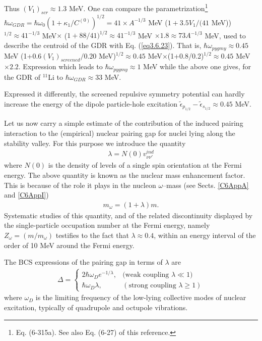 Thus $(V_1)_{scr}\approx1.3$ MeV. One can compare the parametrization\footnote{\cite{Bohr:75} Eq. (6-315a). See also Eq. (6-27) of this reference.} $\hbar\omega_{GDR}=\hbar\omega_0\left(1+\kappa_1/C^{(0)}\right)^{1/2}=41\times A^{-1/3}$ MeV ($1+3.5V_1/(41$ MeV))$^{1/2}\approx41^{-1/3}$ MeV$\times$ ($1+88/41 )^{1/2}\approx41^{-1/3}$ MeV $\times 1.8\approx 73 A^{-1/3}$ MeV, used to describe the centroid of the GDR with Eq. (\ref{eq3.6.23}). That is, $\hbar\omega_{pygmy}\approx0.45$ MeV (1+0.6$(V_1)_{screened}/0.20$ MeV)$^{1/2}\approx0.45$ MeV$\times$(1+0.8/0.2)$^{1/2}\approx0.45$ MeV$\times2.2$. Expression which leads to $\hbar\omega_{pygmy}\approx 1$ MeV while the above one gives, for the GDR of $^{11}$Li to $\hbar\omega_{GDR}\approx 33$ MeV.


Expressed it differently, the screened repulsive symmetry potential can hardly increase the energy of the dipole particle-hole excitation $\tilde\epsilon_{p_{1/2}}-\tilde\epsilon_{s_{1/2}}\approx0.45$ MeV.

Let us now carry a simple estimate of the contribution of the induced pairing interaction to the (empirical) nuclear pairing gap for nuclei lying along the stability valley. For this purpose we introduce the quantity
 \begin{align}
\lambda=N(0)v_{\nu\nu'}^{ind}
 \end{align}
where $N(0)$ is the density of levels of a single spin orientation at the Fermi energy. The above quantity is known as the nuclear mass enhancement factor. This is because of the role it plays in the nucleon $\omega$--mass (see Sects. \ref{C6AppA} and \ref{C6AppI})
 \begin{align}
m_\omega=(1+\lambda)m.
 \end{align}
Systematic studies of this quantity, and of the related discontinuity displayed by the single-particle occupation number at the Fermi energy, namely $Z_\omega=(m/m_\omega)$ testifies to the fact that $\lambda\approx0.4$, within an energy interval of the order of 10 MeV around the Fermi energy.


The BCS expressions of the pairing gap in terms of $\lambda$ are
\begin{align}\label{eq24App3E}
\Delta=\left\{\begin{array}{ll}
2\hbar\omega_De^{-1/\lambda},&\text{(weak coupling } \lambda\ll1)\\ 
\hbar\omega_D\lambda,&(\text{strong coupling }\lambda\geq1)
\end{array}
\right. 
\end{align}
where $\omega_D$ is the limiting frequency of the low-lying collective modes of nuclear excitation, typically of quadrupole and octupole vibrations. 



